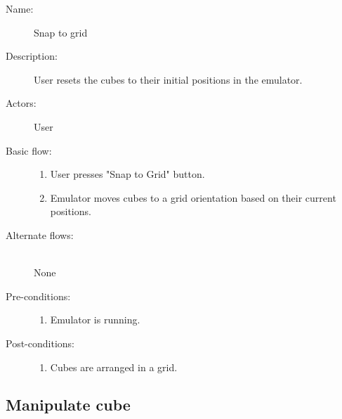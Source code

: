 \documentclass[12pt]{article}
\begin{document}
    \begin{description}
      \item[Name:] Snap to grid
      \item[Description:] User resets the cubes to their initial positions in the emulator.
      \item[Actors:] User
      \item[Basic flow:] \hfill
        \begin{enumerate}
	  \item{User presses "Snap to Grid" button.}
	  \item{Emulator moves cubes to a grid orientation based on their current positions.}
        \end{enumerate}
      \item[Alternate flows:] \hfill \\
	None	
      \item[Pre-conditions:] \hfill
        \begin{enumerate}
	  \item{Emulator is running.}
        \end{enumerate}
      \item[Post-conditions:] \hfill
        \begin{enumerate}
	  \item{Cubes are arranged in a grid.}
        \end{enumerate}
    \end{description}

  \subsection{Manipulate cube}
\end{document}
